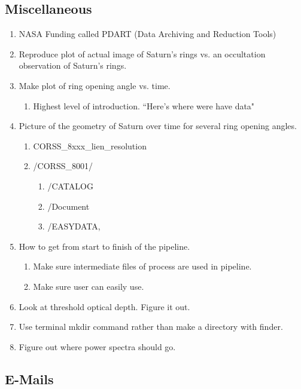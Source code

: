 \documentclass[crop=false,class=book]{standalone}
\begin{document}
\subsection{Miscellaneous}
\begin{enumerate}
    \item NASA Funding called PDART (Data Archiving and Reduction Tools)
    \item Reproduce plot of actual image of Saturn's rings vs. an occultation observation of Saturn's rings.
    \item Make plot of ring opening angle vs. time.
    \begin{enumerate}
        \item Highest level of introduction. ``Here's where were have data"
    \end{enumerate}
    \item Picture of the geometry of Saturn over time for several ring opening angles.
    \begin{enumerate}
        \item CORSS\_8xxx\_lien\_resolution
        \item /CORSS\_8001/
        \begin{enumerate}
            \item /CATALOG
            \item /Document
            \item /EASYDATA, 
        \end{enumerate}
    \end{enumerate}
    \item How to get from start to finish of the pipeline.
    \begin{enumerate}
        \item Make sure intermediate files of process are used in pipeline.
        \item Make sure user can easily use.
    \end{enumerate}
    \item Look at threshold optical depth. Figure it out.
    \item Use terminal mkdir command rather than make a directory with finder.
    \item Figure out where power spectra should go.
\end{enumerate}
\subsection{E-Mails}
\footnotesize
\end{document}
